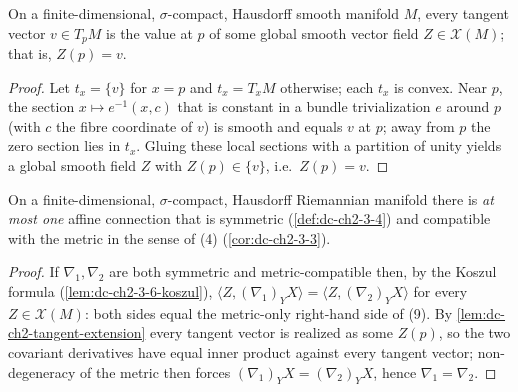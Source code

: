 \begin{lemma}
  \label{lem:dc-ch2-tangent-extension}
  \leanok
  On a finite-dimensional, $\sigma$-compact, Hausdorff smooth manifold $M$, every
  tangent vector $v\in T_pM$ is the value at $p$ of some global smooth vector field
  $Z\in\mathcal{X}(M)$; that is, $Z(p)=v$.
\end{lemma}
\begin{proof}
  \leanok
  Let $t_x=\{v\}$ for $x=p$ and $t_x=T_xM$ otherwise; each $t_x$ is convex. Near
  $p$, the section $x\mapsto e^{-1}(x,c)$ that is constant in a bundle
  trivialization $e$ around $p$ (with $c$ the fibre coordinate of $v$) is smooth and
  equals $v$ at $p$; away from $p$ the zero section lies in $t_x$. Gluing these
  local sections with a partition of unity yields a global smooth field $Z$ with
  $Z(p)\in\{v\}$, i.e.\ $Z(p)=v$.
\end{proof}

\begin{lemma}
  \label{lem:dc-ch2-3-6-unique}
  \leanok
  On a finite-dimensional, $\sigma$-compact, Hausdorff Riemannian manifold there is
  \emph{at most one} affine connection that is symmetric (\cref{def:dc-ch2-3-4})
  and compatible with the metric in the sense of (4) (\cref{cor:dc-ch2-3-3}).
\end{lemma}
\begin{proof}
  \leanok
  If $\nabla_1,\nabla_2$ are both symmetric and metric-compatible then, by the
  Koszul formula (\cref{lem:dc-ch2-3-6-koszul}), $\langle Z,(\nabla_1)_YX\rangle=
  \langle Z,(\nabla_2)_YX\rangle$ for every $Z\in\mathcal{X}(M)$: both sides equal
  the metric-only right-hand side of (9). By \cref{lem:dc-ch2-tangent-extension}
  every tangent vector is realized as some $Z(p)$, so the two covariant derivatives
  have equal inner product against every tangent vector; non-degeneracy of the
  metric then forces $(\nabla_1)_YX=(\nabla_2)_YX$, hence $\nabla_1=\nabla_2$.
\end{proof}

